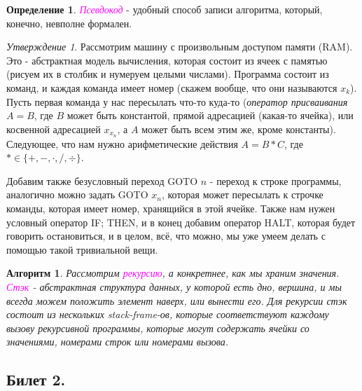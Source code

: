 \documentclass[a4paper]{article}
\theoremstyle{indented}
\newtheorem{alg}{Алгоритм}
\theoremstyle{definition}
\newtheorem{defn}{Определение}
\theoremstyle{remark}
\newtheorem{stat}{Утверждение}
\begin{document}
\begin{defn}
    \textcolor{magenta}{\hypertarget{d-2}{\textit{Псевдокод}}} - удобный способ записи алгоритма, который, конечно, невполне формален.
\end{defn}

\begin{stat}
    Рассмотрим машину с произвольным доступом памяти (RAM). Это - абстрактная модель вычисления, которая состоит из ячеек с памятью (рисуем их в столбик и нумеруем целыми числами). Программа состоит из команд, и каждая команда имеет номер (скажем вообще, что они называются $x_k$). Пусть первая команда у нас пересылать что-то куда-то (\textit{оператор присваивания} $A=B$, где $B$ может быть константой, прямой адресацией (какая-то ячейка), или косвенной адресацией $x_{x_n}$, а $A$ может быть всем этим же, кроме константы). Следующее, что нам нужно арифметические действия $A=B*C$, где $*\in\{+, -, \cdot, /, \div\}$. \ 

    Добавим также безусловный переход GOTO $n$ - переход к строке программы, аналогично можно задать GOTO $x_n$, которая может пересылать к строчке команды, которая имеет номер, хранящийся в этой ячейке. Также нам нужен условный оператор {IF; THEN}, и в конец добавим оператор HALT, которая будет говорить остановиться, и в целом, всё, что можно, мы уже умеем делать с помощью такой тривиальной вещи. \ 
\end{stat}

\begin{alg}
    Рассмотрим \textcolor{magenta}{\hypertarget{d-3}{\textit{рекурсию}}}, а конкретнее, как мы храним значения. \textcolor{magenta}{\hypertarget{d-4}{\textit{Стэк}}} - абстрактная структура данных, у которой есть дно, вершина, и мы всегда можем положить элемент наверх, или вынести его. Для рекурсии стэк состоит из нескольких stack-frame-ов, которые соответствуют каждому вызову рекурсивной программы, которые могут содержать ячейки со значениями, номерами строк или номерами вызова.
\end{alg}

\subsection{Билет 2.}
\end{document}
